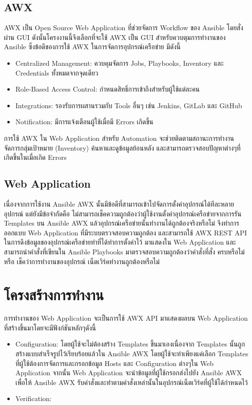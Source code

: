 \subsection{AWX}
\hspace{0.5in} AWX เป็น Open Source Web Application ที่ช่วยจัดการ Workflow ของ Ansible โดยสั่งผ่าน GUI ดังนั้นโครงงานนี้จึงเลือกที่จะใช้ AWX เป็น GUI สำหรับควบตุมการทำงานของ Ansible ซึ่งข้อดีของการใช้ AWX ในการจัดการอุปกรณ์เครือข่าย มีดังนี้
\begin{itemize}
  \item Centralized Management: ควบคุมจัดการ Jobs, Playbooks, Inventory และ Credentials ทั้งหมดจากจุดเดียว
  \item Role-Based Access Control: กำหนดสิทธิ์การเข้าถึงสำหรับผู้ใช้แต่ละคน
  \item Integrations: รองรับการผสานรวมกับ Tools อื่นๆ เช่น Jenkins, GitLab และ GitHub
  \item Notification: มีการแจ้งเตือนผู้ใช้เมื่อมี Errors เกิดขึ้น
\end{itemize}
\hspace{0.5in} การใช้ AWX ใน Web Application สำหรับ Automation จะช่วยติดตามสถานะการทำงาน จัดการกลุ่มเป้าหมาย (Inventory) ค้นหาและดูข้อมูลย้อนหลัง และสามารถตรวจสอบปัญหาต่างๆที่เกิดขึ้นในเมื่อเกิด Errors

\subsection{Web Application}
\hspace{0.5in} เนื่องจากการใช้งาน Ansible AWX นั้นมีข้อดีที่สามารถเข้าไปจัดการตั้งค่าอุปกรณ์ได้ทีละหลายอุปกรณ์ แต่ยังมีข้อจำกัดคือ ไม่สามารถเช็คความถูกต้องว่าผู้ใช้งานตั้งค่าอุปกรณ์เครือข่ายจากการรัน Templates บน Ansible AWX แล้วอุปกรณ์เครือข่ายนั้นทำงานได้ถูกต้องจริงหรือไม่ จึงทำการออกแบบ Web Application ที่มีระบบตรวจสอบความถูกต้อง และสามารถใช้ AWX REST API ในการดึงข้อมูลของอุปกรณ์เครือข่ายทำที่ได้ทำการตั้งค่าไว้ มาแสดงใน Web Application และสามารถนำคำสั่งที่เขียนใน Ansible Playbooks มาตรวจสอบความถูกต้องว่าคำสั่งที่สั่ง ครบหรือไม่ หรือ เช็คว่าการทำงานของอุปกรณ์ เน็ตเวิร์คทำงานถูกต้องหรือไม่

\section{โครงสร้างการทำงาน}
\hspace{0.5in} การทำงานของ Web Application จะเป็นการใช้ AWX API มาแสดงผลบน Web Application ที่สร้างขึ้นมาโดยจะมีฟังก์ชันหลักๆดังนี้
\begin{itemize}
  \item Configuration: โดยผู้ใช้จะไม่ต้องสร้าง Templates ขึ้นมาเองเนื่องจาก Templates นั้นถูกสร้างแบบสำเร็จรูปไว้เรียบร้อยแล้วใน Ansible AWX โดยผู้ใช้จะทำเพียงแค่เลือก Templates ที่ผู้ใช้ต้องการจัดการและกรอกข้อมูล Hosts และ Configuration ต่างๆใน Web Application จากนั้น Web Application จะนำข้อมูลที่ผู้ใช้กรอกส่งไปยัง Ansible AWX เพื่อให้ Ansible AWX รับคำสั่งและทำตามคำสั่งเหล่านั้นในอุปกรณ์เน็ตเวิร์คที่ผู้ใช้ได้กำหนดไว้
  \item Verification: 
\end{itemize}